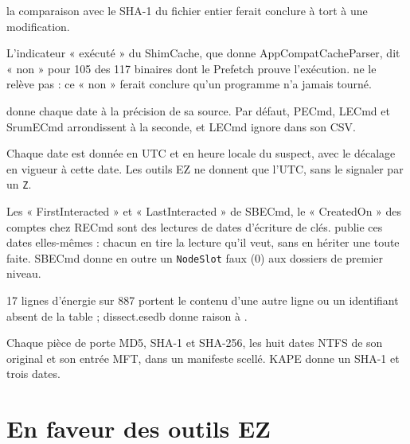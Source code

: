 \documentclass[11pt,a4paper,oneside]{report}
\begin{document}
\begin{description}[style=nextline,leftmargin=1em]
        la comparaison avec le SHA-1 du fichier entier ferait conclure à tort à
        une modification.
  \item[Pas de champ trompeur] L'indicateur « exécuté » du ShimCache, que donne
        AppCompatCacheParser, dit « non » pour 105 des 117 binaires dont le
        Prefetch prouve l'exécution. \wac{} ne le relève pas : ce « non » ferait
        conclure qu'un programme n'a jamais tourné.
  \item[Précision au 100\,ns] \wac{} donne chaque date à la précision de sa
        source. Par défaut, PECmd, LECmd et SrumECmd arrondissent à la seconde, et
        LECmd ignore  dans son CSV.
  \item[Heure locale datée] Chaque date est donnée en UTC et en heure locale du
        suspect, avec le décalage en vigueur à cette date. Les outils EZ ne
        donnent que l'UTC, sans le signaler par un \texttt{Z}.
  \item[Lectures d'autrui vérifiées] Les « FirstInteracted » et
        « LastInteracted » de SBECmd, le « CreatedOn » des comptes chez RECmd sont
        des lectures de dates d'écriture de clés. \wac{} publie ces dates
        elles-mêmes : chacun en tire la lecture qu'il veut, sans en hériter une
        toute faite. SBECmd donne en outre un \texttt{NodeSlot} faux (0) aux
        dossiers de premier niveau.
  \item[Erreurs de lecture ESE de SrumECmd] 17 lignes d'énergie sur 887 portent
        le contenu d'une autre ligne ou un identifiant absent de la table ;
        dissect.esedb donne raison à \wac{}.
  \item[Collecte] Chaque pièce de \wac{} porte MD5, SHA-1 et SHA-256, les huit
        dates NTFS de son original et son entrée MFT, dans un manifeste scellé.
        KAPE donne un SHA-1 et trois dates.
\end{description}

\section{En faveur des outils EZ}\label{sec:couverture}
\end{document}
